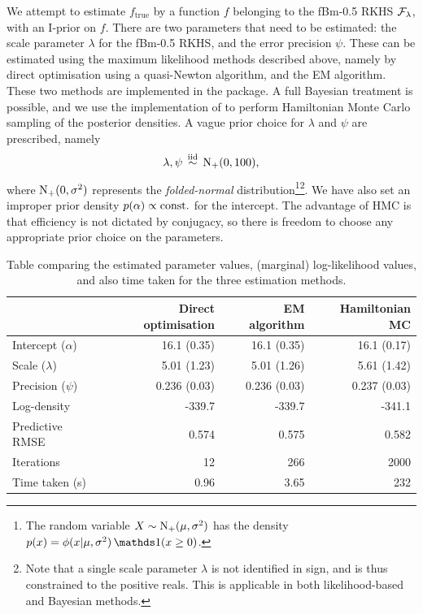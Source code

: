 We attempt to estimate $f_\text{true}$ by a function $f$ belonging to the fBm-0.5 RKHS ${\mathcal F}_\lambda$, with an I-prior on $f$.
There are two parameters that need to be estimated: the scale parameter $\lambda$ for the fBm-0.5 RKHS, and the error precision $\psi$.
These can be estimated using the maximum likelihood methods described above, namely by direct optimisation using a quasi-Newton algorithm, and the EM algorithm.
These two methods are implemented in the  package. 
A full Bayesian treatment is possible, and we use the  implementation of  to perform Hamiltonian Monte Carlo sampling of the posterior densities.
A vague prior choice for $\lambda$ and $\psi$ are prescribed, namely
\[
  \lambda,\psi \,\overset{\text{iid}}{\sim}\, \operatorname{N}_+(0,100),
\]
where $\operatorname{N}_+(0,\sigma^2)$ represents the \emph{folded-normal} distribution\footnote{The random variable $X \sim \operatorname{N}_+(\mu,\sigma^2)$ has the density $p(x) = \phi(x|\mu,\sigma^2)\ind(x \geq 0)$.}\footnote{Note that a single scale parameter $\lambda$ is not identified in sign, and is thus constrained to the positive reals. This is applicable in both likelihood-based and Bayesian methods.}.
We have also set an improper prior density $p(\alpha) \propto \text{const.}\hspace{0.01em}$ for the intercept.
The advantage of HMC is that efficiency is not dictated by conjugacy, so there is freedom to choose any appropriate prior choice on the parameters.

\begin{table}[hbt]
\centering
\caption{Table comparing the estimated parameter values, (marginal) log-likelihood values, and also time taken for the three estimation methods.}
\label{tab:comparemethodsestimate}
\begin{tabular}{@{}lrrr@{}}
\toprule
               & Direct optimisation & EM algorithm & Hamiltonian MC          \\ \midrule
Intercept ($\alpha$)      & 16.1 (0.35)           & 16.1 (0.35)    & 16.1 (0.17)  \\
Scale ($\lambda$)      & 5.01 (1.23)         & 5.01 (1.26)  & 5.61 (1.42)     \\
Precision ($\psi$)         & 0.236 (0.03)        & 0.236 (0.03) & 0.237 (0.03)\\[0.5em]
Log-density    & -339.7              & -339.7       & -341.1                  \\
Predictive RMSE & 0.574               & 0.575        & 0.582                   \\[0.5em]
Iterations     & 12                  & 266          & 2000                    \\
Time taken (s) & 0.96                & 3.65         & 232                     \\ \bottomrule
\end{tabular}
\end{table}

